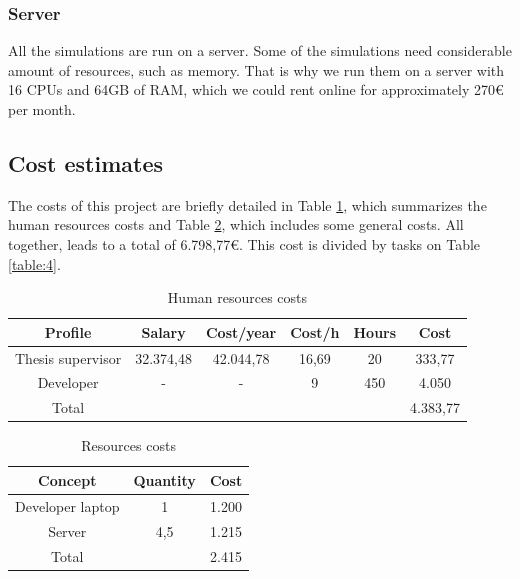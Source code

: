 \documentclass{article}
\begin{document}
\subsubsection{Server}
All the simulations are run on a server. Some of the simulations need considerable amount of resources, such as memory. That is why we run them on a server with 16 CPUs and 64GB of RAM, which we could rent online for approximately 270€ per month.

\subsection{Cost estimates}
The costs of this project are briefly detailed in Table \ref{table:2}, which summarizes the human resources costs and Table \ref{table:3}, which includes some general costs. All together, leads to a total of 6.798,77€. This cost is divided by tasks on Table \ref{table:4}.

\begin{table}[h!]
\centering
\begin{tabular}{|c|c|c|c|c|c|} 
 \hline
 Profile & Salary & Cost/year & Cost/h & Hours & Cost \\
 \hline
 Thesis supervisor & 32.374,48 & 42.044,78 & 16,69 & 20 & 333,77 \\
 Developer & - & - & 9 & 450 & 4.050 \\
 \hline
 \hline
 Total & & & & & 4.383,77 \\
 \hline
\end{tabular}
 \caption{Human resources costs}
 \label{table:2}
\end{table}


\begin{table}[h!]
\centering
\begin{tabular}{|c|c|c|} 
 \hline
 Concept & Quantity & Cost \\
 \hline
 Developer laptop & 1 & 1.200 \\
 Server & 4,5 & 1.215 \\
 \hline
 \hline
 Total & & 2.415 \\
 \hline
\end{tabular}

 \caption{Resources costs}
 
 \label{table:3}
\end{table}
\end{document}
